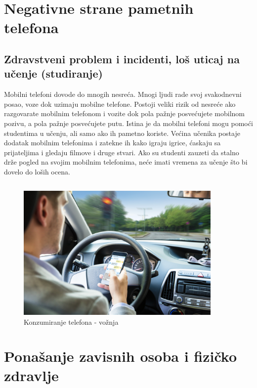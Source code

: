\documentclass[a4paper]{article}
\begin{document}
\newpage

\section{Negativne strane pametnih telefona}

\subsection{Zdravstveni problem i incidenti, loš uticaj na učenje (studiranje)}
Mobilni telefoni dovode do mnogih nesreća.
Mnogi ljudi rade svoj svakodnevni posao, voze dok uzimaju mobilne telefone.
Postoji veliki rizik od nesreće ako razgovarate mobilnim telefonom i vozite
dok pola pažnje posvećujete mobilnom pozivu, a pola pažnje posvećujete putu.
\newline
\newline
Istina je da mobilni telefoni mogu pomoći studentima u učenju,
ali samo ako ih pametno koriste.
Većina učenika postaje dodatak mobilnim telefonima
i zatekne ih kako igraju igrice, ćaskaju sa prijateljima i gledaju filmove
i druge stvari. Ako su studenti zauzeti da stalno drže pogled na svojim
mobilnim telefonima, neće imati vremena za učenje što bi dovelo do loših ocena.

\begin{verbatim}
\end{verbatim}
\begin{figure}[h!]
\centering
\begin{center}
\includegraphics[width=100mm]{image2.jpg}
\end{center}
\caption{Konzumiranje telefona - vožnja}
\label{fig:vr}
\end{figure}


\newpage
\section{Ponašanje zavisnih osoba i fizičko zdravlje}
\end{document}
